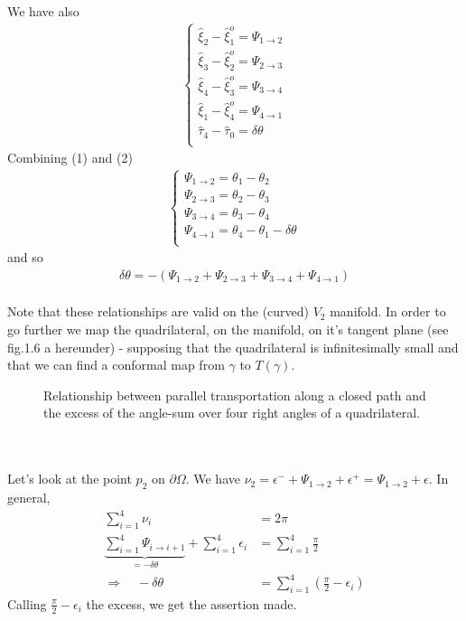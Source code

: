 We have also
\begin{align}
\left \{ \begin{array}{l}
\widehat{\xi}_{2}  - \widehat{\xi}^{o}_{1} = \Psi_{1 \rightarrow 2}\\
\widehat{\xi}_{3}  - \widehat{\xi}^{o}_{2} = \Psi_{2 \rightarrow 3}\\
\widehat{\xi}_{4}  - \widehat{\xi}^{o}_{3} = \Psi_{3 \rightarrow 4}\\
\widehat{\xi}_{1}  - \widehat{\xi}^{o}_{4} = \Psi_{4 \rightarrow 1}\\
\widehat{\tau}_{4}-\widehat{\tau}_{0} = \delta \theta\\ 
\end{array} \right.
\end{align}
Combining (1) and (2)
\begin{align}
\left \{ \begin{array}{l}
\Psi_{1 \rightarrow 2} = \theta_{1}-\theta_{2}\\
\Psi_{2 \rightarrow 3}= \theta_{2}-\theta_{3}\\
\Psi_{3 \rightarrow 4}= \theta_{3}-\theta_{4}\\
\Psi_{4 \rightarrow 1}= \theta_{4}-\theta_{1}- \delta \theta\\
\end{array} \right.
\end{align}
and so 
\begin{align}
\delta \theta = -(\Psi_{1 \rightarrow 2}+\Psi_{2 \rightarrow 3}+\Psi_{3 \rightarrow 4}+\Psi_{4 \rightarrow 1})
\end{align}\\
Note that these relationships are valid on the (curved) $V_{2}$ manifold. In order to go further we map the quadrilateral, on the manifold, on it's tangent plane (see fig.1.6 a hereunder) - supposing that the quadrilateral is infinitesimally small and that we can find a conformal map from $\gamma$ to $T(\gamma)$.
\begin{figure}[h]%
    \centering
    \subfloat[]{}
	\qquad
    \subfloat[]{}
\caption{Relationship between parallel transportation along a closed path and the excess of the angle-sum over four right angles of a quadrilateral.}
\end{figure}\\
\\ Let's look at the point $p_2$ on $\partial \Omega$. We have $\nu_2 = \epsilon^{-}+\Psi_{1 \rightarrow 2} +\epsilon^{+}= \Psi_{1 \rightarrow 2}+\epsilon$. In general,
\begin{align}
\sum_{i=1}^{4} \nu_i &= 2\pi \\
\underbrace{\sum_{i=1}^{4} \Psi_{i \rightarrow i+1}}_{= - \delta \theta} +\sum_{i=1}^{4} \epsilon_{i} &= \sum_{i=1}^{4} \frac{\pi}{2} \\
\Rightarrow \quad - \delta \theta &= \sum_{i=1}^{4}(\frac{\pi}{2} - \epsilon _{i})
\end{align}
Calling $\frac{\pi}{2} - \epsilon _{i}$ the excess, we get the assertion made.

